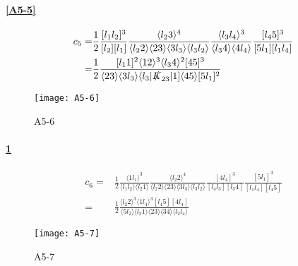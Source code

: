 \paragraph{\ref{A5-5}}
\begin{equation*}
\begin{split}
c_5 = & \frac{1}{2}\frac{[l_1 l_2]^3}{[l_2][l_1]}\frac{\langle l_2 3 \rangle^4}{\langle l_2 2 \rangle\langle 23 \rangle\langle 3 l_3 \rangle\langle l_3 l_2\rangle}
\frac{\langle l_3 l_4 \rangle^3}{\langle l_3 4 \rangle\langle 4 l_4 \rangle}
\frac{[l_4 5]^3}{[5 l_1][l_1 l_4]}
\\
= &
\frac{1}{2}\frac{[l_1 1 ]^2 \langle 12 \rangle^3 \langle l_3 4 \rangle^2[45]^3}{\langle 23 \rangle\langle 3 l_3 \rangle\langle l_3 |\slashed{K}_{23}|1]\langle 45 \rangle [5l_1]^2}
\end{split}
\end{equation*}
%
%
\begin{figure}
  \centering
    \texttt{[image: A5-6]}
    \caption{A5-6}
  \label{A5-6}
\end{figure}
\paragraph{\ref{A5-6}}
\begin{equation*}
\begin{split}
c_6 = & \frac{1}{2}\frac{\langle 1l_1\rangle^3}{\langle l_1 l_2 \rangle\langle l_2 1 \rangle}
\frac{\langle l_2 2 \rangle^4}{\langle l_2 2\rangle\langle 23 \rangle\langle 3l_3\rangle\langle l_3 l_2 \rangle}
\frac{[4l_4]^3}{[l_4 l_3][l_3 4]}
\frac{[5l_1]^3}{[l_1l_4][l_4 5]}
\\
= &
\frac{1}{2}
\frac{\langle l_2 2 \rangle^3\langle 1 l_4\rangle^3[l_4 5][4 l_4]}{\langle 5 l_2 \rangle\langle l_2 1 \rangle\langle 23 \rangle\langle 34 \rangle\langle l_2 l_4 \rangle}
\end{split}
\end{equation*}
%
%
\begin{figure}
  \centering
    \texttt{[image: A5-7]}
    \caption{A5-7}
  \label{A5-7}
\end{figure}
